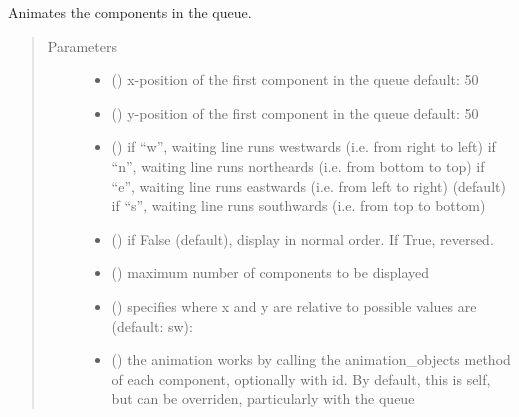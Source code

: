 \documentclass[letterpaper,10pt,english]{sphinxmanual}
\begin{document}
\begin{fulllineitems}
\begin{fulllineitems}
\end{fulllineitems}


\begin{fulllineitems}
\label{\detokenize{Reference:salabim.Queue.animate}}
Animates the components in the queue.
\begin{quote}\begin{description}
\item[{Parameters}] \leavevmode\begin{itemize}
\item {} 
 () \textendash{} x-position of the first component in the queue 
default: 50

\item {} 
 () \textendash{} y-position of the first component in the queue 
default: 50

\item {} 
 () \textendash{} if “w”, waiting line runs westwards (i.e. from right to left) 
if “n”, waiting line runs northeards (i.e. from bottom to top) 
if “e”, waiting line runs eastwards (i.e. from left to right) (default) 
if “s”, waiting line runs southwards (i.e. from top to bottom)

\item {} 
 () \textendash{} if False (default), display in normal order. If True, reversed.

\item {} 
 () \textendash{} maximum number of components to be displayed

\item {} 
 () \textendash{} specifies where x and y are relative to 
possible values are (default: sw): 

\item {} 
 () \textendash{} the animation works by calling the animation\_objects method of each component, optionally
with id. By default, this is self, but can be overriden, particularly with the queue


\end{itemize}
\end{description}
\end{quote}
\end{fulllineitems}
\end{fulllineitems}
\end{document}
